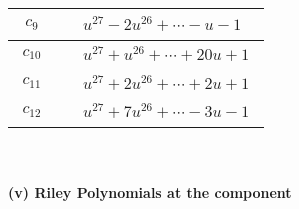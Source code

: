 \documentclass[1p]{elsarticle_modified}
\theoremstyle{definition}
\begin{document}
\begin{tabular}{m{50pt}|m{274pt}}
\hline $$\begin{aligned}c_{9}\end{aligned}$$&$\begin{aligned}
&u^{27}-2 u^{26}+\cdots- u-1
\end{aligned}$\\
\hline $$\begin{aligned}c_{10}\end{aligned}$$&$\begin{aligned}
&u^{27}+u^{26}+\cdots+20 u+1
\end{aligned}$\\
\hline $$\begin{aligned}c_{11}\end{aligned}$$&$\begin{aligned}
&u^{27}+2 u^{26}+\cdots+2 u+1
\end{aligned}$\\
\hline $$\begin{aligned}c_{12}\end{aligned}$$&$\begin{aligned}
&u^{27}+7 u^{26}+\cdots-3 u-1
\end{aligned}$\\
\hline
\end{tabular}\\~\\
\newpage\renewcommand{\arraystretch}{1}
\flushleft \textbf{(v) Riley Polynomials at the component}\newline \\
\end{document}
